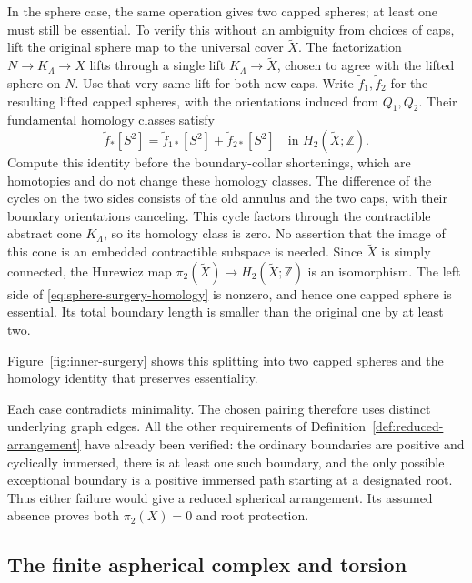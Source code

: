 In the sphere case, the same operation gives two capped spheres; at
least one must still be essential.  To verify this without an
ambiguity from choices of caps, lift the original sphere map to the
universal cover $\widetilde X$.  The factorization $N\to K_\Lambda\to
X$ lifts through a single lift $K_\Lambda\to\widetilde X$, chosen to
agree with the lifted sphere on $N$.  Use that very same lift for
both new caps.  Write $\widetilde f_1,\widetilde f_2$ for the resulting
lifted capped spheres, with the orientations induced from $Q_1,Q_2$.
Their fundamental homology classes satisfy
\begin{equation}\label{eq:sphere-surgery-homology}
 \widetilde f_*[S^2]
   =\widetilde f_{1*}[S^2]+\widetilde f_{2*}[S^2]
       \quad\text{in }H_2(\widetilde X;\mathbb Z).
\end{equation}
Compute this identity before the boundary-collar shortenings, which
are homotopies and do not change these homology classes.  The
difference of the cycles on the two sides consists of the
old annulus and the two caps, with their boundary orientations
canceling.  This cycle factors through the contractible abstract cone
$K_\Lambda$, so its homology class is zero.  No assertion that the
image of this cone is an embedded contractible subspace is needed.
Since $\widetilde X$ is simply connected, the Hurewicz map
$\pi_2(\widetilde X)\to H_2(\widetilde X;\mathbb Z)$ is an
isomorphism.  The left side of \eqref{eq:sphere-surgery-homology} is
nonzero, and hence one capped sphere is essential.  Its total boundary
length is smaller than the original one by at least two.

Figure~\ref{fig:inner-surgery} shows this splitting into two capped
spheres and the homology identity that preserves essentiality.



Each case contradicts minimality.  The chosen pairing therefore uses
distinct underlying graph edges.  All the other requirements of
Definition~\ref{def:reduced-arrangement} have already been verified:
the ordinary boundaries are positive and cyclically immersed, there
is at least one such boundary, and the only possible exceptional
boundary is a positive immersed path starting at a designated root.
Thus either failure would give a reduced spherical arrangement.  Its
assumed absence proves both $\pi_2(X)=0$ and root protection.

\subsection{The finite aspherical complex and torsion}

